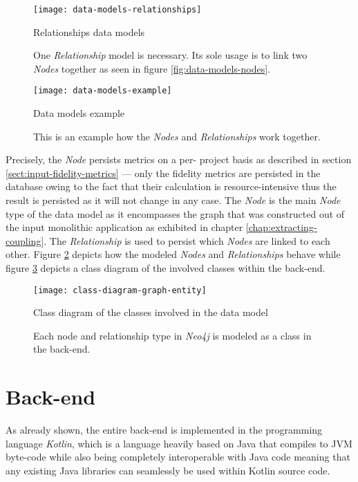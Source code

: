 \documentclass[12pt,a4paper]{report}
\begin{document}
\begin{figure}[htbp]
\centering
\texttt{[image: data-models-relationships]}
\caption{Relationships data models}
\caption*{\centering
  One \textit{Relationship} model is necessary. Its sole usage is to link
  two  \textit{Nodes} together as seen in figure \ref{fig:data-models-nodes}.
}
\label{fig:data-models-relationships}
\end{figure}

\begin{figure}[htbp]
\centering
\texttt{[image: data-models-example]}
\caption{Data models example}
\caption*{\centering
  This is an example how the \textit{Nodes} and \textit{Relationships} work together.
}
\label{fig:data-models-example}
\end{figure}

Precisely, the  \textit{Node} persists metrics on a per\hyp
project basis as described in section \ref{sect:input-fidelity-metrics} ---
only the fidelity metrics are persisted in the database owing to the fact that
their calculation is resource\hyp intensive thus the result is persisted as it
will not change in any case. The  \textit{Node} is the main \textit{
Node} type of the data model as it encompasses the graph that was constructed
out of the input monolithic application as exhibited in chapter
\ref{chap:extracting-coupling}. The  \textit{Relationship}
is used to persist which  \textit{Nodes} are linked to each other.
Figure \ref{fig:data-models-example} depicts how the modeled \textit{Nodes}
and \textit{Relationships} behave while figure \ref{fig:class-diagram-graph-entity}
depicts a class diagram of the involved classes within the back-end.

\begin{figure}[htbp]
\centering
\texttt{[image: class-diagram-graph-entity]}
\caption{Class diagram of the classes involved in the data model}
\caption*{\centering
  Each node and relationship type in \textit{Neo4j} is modeled as a class
  in the back-end.
}
\label{fig:class-diagram-graph-entity}
\end{figure}



\section{Back-end} \label{sect:implementation-back-end}

As already shown, the entire back-end is implemented in the programming
language \textit{Kotlin}, which is a language heavily based on Java that
compiles to JVM byte-code while also being completely interoperable with Java
code meaning that any existing Java libraries can seamlessly be used within
Kotlin source code.
\end{document}
